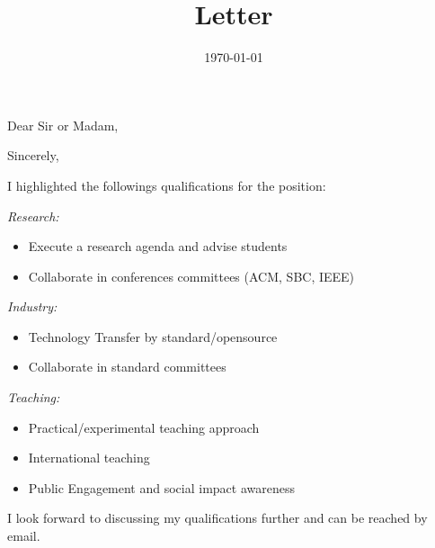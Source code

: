 \documentclass[10pt,a4paper,sans,colorlinks]{moderncv}
\title{Letter}
\begin{document}
\hfHyperrefSetupBlueLinks

\recipient{\ }{}
\opening{Dear Sir or Madam,}
\date{\today}
\closing{Sincerely,}

\makelettertitle

\justify


I highlighted the followings qualifications for the position:

\textit{Research:}
\begin{itemize}[mynosep]
  \item Execute a research agenda and advise students
  \item Collaborate in conferences committees (ACM, SBC, IEEE)
\end{itemize}

\textit{Industry:}
\begin{itemize}[mynosep]
  \item Technology  Transfer by standard/opensource
  \item Collaborate in standard committees
\end{itemize}

\textit{Teaching:}
\begin{itemize}[mynosep]
  \item Practical/experimental teaching approach
  \item International teaching
  \item Public Engagement and social impact awareness
\end{itemize}

I look forward to discussing my qualifications further and can be reached by email.

\makeletterclosing
\end{document}
